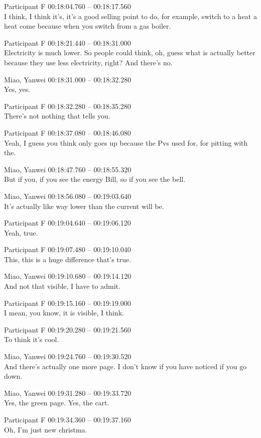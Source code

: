 {Participant F 00:18:04.760 -- 00:18:17.560 \\
I think, I think it's, it's a good selling point to do, for example, switch to a heat a heat come because when you switch from a gas boiler.

Participant F 00:18:21.440 -- 00:18:31.000 \\
Electricity is much lower. So people could think, oh, guess what is actually better because they use less electricity, right? And there's no.

Miao, Yanwei 00:18:31.000 -- 00:18:32.280 \\
Yes, yes.

Participant F 00:18:32.280 -- 00:18:35.280 \\
There's not nothing that tells you.

Participant F 00:18:37.080 -- 00:18:46.080 \\
Yeah, I guess you think only goes up because the Pvs used for, for pitting with the.

Miao, Yanwei 00:18:47.760 -- 00:18:55.320 \\
But if you, if you see the energy Bill, so if you see the bell.

Miao, Yanwei 00:18:56.080 -- 00:19:03.640 \\
It's actually like way lower than the current will be.

Participant F 00:19:04.640 -- 00:19:06.120 \\
Yeah, true.

Participant F 00:19:07.480 -- 00:19:10.040 \\
This, this is a huge difference that's true.

Miao, Yanwei 00:19:10.680 -- 00:19:14.120 \\
And not that visible, I have to admit.

Participant F 00:19:15.160 -- 00:19:19.000 \\
I mean, you know, it is visible, I think.

Participant F 00:19:20.280 -- 00:19:21.560 \\
To think it's cool.

Miao, Yanwei 00:19:24.760 -- 00:19:30.520 \\
And there's actually one more page. I don't know if you have noticed if you go down.

Miao, Yanwei 00:19:31.280 -- 00:19:33.720 \\
Yes, the green page. Yes, the cart.

Participant F 00:19:34.360 -- 00:19:37.160 \\
Oh, I'm just new christma.

}
